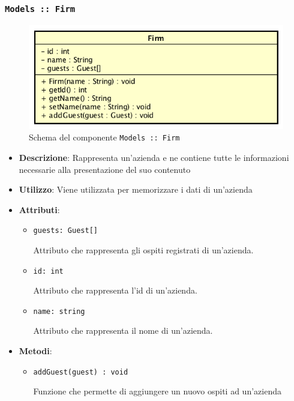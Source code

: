 \documentclass[../DefinizioneDiProdotto.tex]{subfiles}
\begin{document}
\begin{itemize}
\begin{itemize}
	\end{itemize}

	\newpage
	\subsubsection{\texttt{Models :: Firm}}
	\begin{figure}[!h]
		\centering
		\includegraphics[scale=0.7]{Architettura/Models/Firm.png}
		\caption{Schema del componente \texttt{Models :: Firm}}
	\end{figure}
	\begin{itemize}\item \textbf{Descrizione}: Rappresenta un'azienda e ne contiene tutte le informazioni necessarie alla presentazione del suo contenuto
	\item \textbf{Utilizzo}: Viene utilizzata per memorizzare i dati di un'azienda
	\item \textbf{Attributi}:
	\begin{itemize}
	\item \texttt{guests: Guest[]}\

	 Attributo che rappresenta gli ospiti registrati di un'azienda.
	\end{itemize}
	\begin{itemize}
	\item \texttt{id: int}\

	 Attributo che rappresenta l'id di un'azienda.
	\end{itemize}
	\begin{itemize}
	\item \texttt{name: string}\

	 Attributo che rappresenta il nome di un'azienda.
	\end{itemize}
	\item \textbf{Metodi}:
	\begin{itemize}
	\item \texttt{addGuest(guest) : void}\

	 Funzione che permette di aggiungere un nuovo ospiti ad un'azienda


\end{itemize}
\end{itemize}
\end{itemize}
\end{document}

